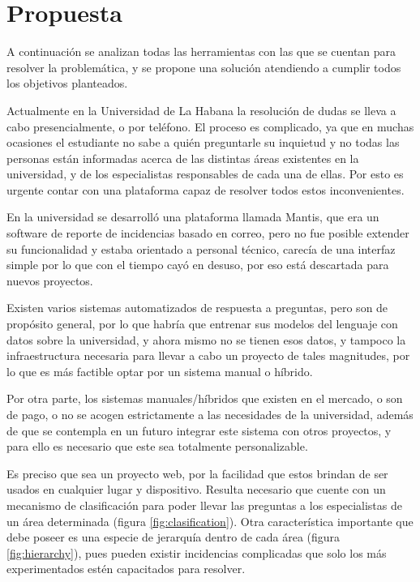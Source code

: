 \chapter{Propuesta}\label{chapter:proposal}

A continuación se analizan todas las herramientas con las que se cuentan para resolver la problemática, y se propone una solución atendiendo a cumplir todos los objetivos planteados.
\newline

Actualmente en la Universidad de La Habana la resolución de dudas se lleva a cabo presencialmente, o por teléfono. El proceso es complicado, ya que en muchas ocasiones el estudiante no sabe a quién preguntarle su inquietud y no todas las personas están informadas acerca de las distintas áreas existentes en la universidad, y de los especialistas responsables de cada una de ellas. Por esto es urgente contar con una plataforma capaz de resolver todos estos inconvenientes.
\newline

En la universidad se desarrolló una plataforma llamada Mantis, que era un software de reporte de incidencias basado en correo, pero no fue posible extender su funcionalidad y estaba orientado a personal técnico, carecía de una interfaz simple por lo que con el tiempo cayó en desuso, por eso está descartada para nuevos proyectos.
\newline

Existen varios sistemas automatizados de respuesta a preguntas, pero son de propósito general, por lo que habría que entrenar sus modelos del lenguaje con datos sobre la universidad, y ahora mismo no se tienen esos datos, y tampoco la infraestructura necesaria para llevar a cabo un proyecto de tales magnitudes, por lo que es más factible optar por un sistema manual o híbrido.
\newline

Por otra parte, los sistemas manuales/híbridos que existen en el mercado, o son de pago, o no se acogen estrictamente a las necesidades de la universidad, además de que se contempla en un futuro integrar este sistema con otros proyectos, y para ello es necesario que este sea totalmente personalizable.
\newline

Es preciso que sea un proyecto web, por la facilidad que estos brindan de ser usados en cualquier lugar y dispositivo. Resulta necesario que cuente con un mecanismo de clasificación para poder llevar las preguntas a los especialistas de un área determinada (figura \ref{fig:clasification}). Otra característica importante que debe poseer es una especie de jerarquía dentro de cada área (figura \ref{fig:hierarchy}), pues pueden existir incidencias complicadas que solo los más experimentados estén capacitados para resolver.
\newline

